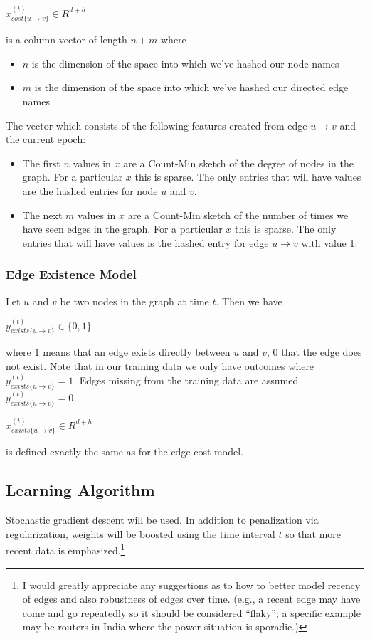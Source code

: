 \documentclass{article} %
\begin{document}
$x_{cost\{u \rightarrow v\}}^{(t)} \in R^{d+h}$ 

is a column vector of length $n+m$
where 
\begin{itemize}
\item $n$ is the dimension of the space into which we've hashed our node names
\item $m$ is the dimension of the space into which we've hashed our directed
edge names
\end{itemize}

The vector which consists of the following features created from
edge $u \rightarrow v$ and the current epoch:
\begin{itemize}
\item The first $n$ values in $x$ are a Count-Min sketch of the degree of nodes in
  the graph.  For a particular $x$ this is sparse.  The only entries that will have values are the hashed entries for node $u$ and $v$.
\item The next $m$ values in $x$ are a Count-Min sketch of the number of
  times we have seen edges in the graph.  For a particular $x$ this is
  sparse.  The only entries that will have values is the hashed entry for
  edge $u \rightarrow v$ with value 1.
\end{itemize}

\subsubsection{Edge Existence Model}

Let $u$ and $v$ be two nodes in the graph at time $t$.  Then we have

$y_{exists\{u \rightarrow v\}}^{(t)} \in \{0,1\}$ 

where $1$ means that an edge exists directly
between $u$ and $v$, $0$ that the edge does not exist.  Note that in our
training data we only have outcomes where $y_{exists\{u \rightarrow v\}}^{(t)} = 1$.
Edges missing from the training data are assumed $y_{exists\{u \rightarrow v\}}^{(t)} = 0$.

$x_{exists\{u \rightarrow v\}}^{(t)} \in R^{d+h}$ 

is defined exactly the same as for the
edge cost model.

\subsection{Learning Algorithm}

Stochastic gradient descent will be used.  In addition to penalization via
regularization, weights will be boosted using the time interval $t$ so that more
recent data is emphasized.\footnote{I would greatly appreciate any
  suggestions as to how to better model recency of edges and also robustness
  of edges over time.  (e.g., a recent edge may have come and go repeatedly so it
  should be considered ``flaky''; a specific example may be routers in India
  where the power situation is sporadic.)}
\end{document}
